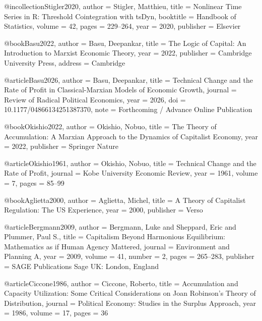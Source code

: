 @incollection{Stigler2020,
	author    = {Stigler, Matthieu},
	title     = {Nonlinear Time Series in {R}: Threshold Cointegration with {tsDyn}},
	booktitle = {Handbook of Statistics},
	volume    = {42},
	pages     = {229--264},
	year      = {2020},
	publisher = {Elsevier}
}



@book{Basu2022,
	author    = {Basu, Deepankar},
	title     = {The Logic of Capital: An Introduction to {Marxist} Economic Theory},
	year      = {2022},
	publisher = {Cambridge University Press},
	address   = {Cambridge}
}

@article{Basu2026,
	author  = {Basu, Deepankar},
	title   = {Technical Change and the Rate of Profit in {Classical-Marxian} Models of Economic Growth},
	journal = {Review of Radical Political Economics},
	year    = {2026},
	doi     = {10.1177/04866134251387370},
	note    = {Forthcoming / Advance Online Publication}
}

@book{Okishio2022,
	author    = {Okishio, Nobuo},
	title     = {The Theory of Accumulation: A {Marxian} Approach to the Dynamics of Capitalist Economy},
	year      = {2022},
	publisher = {Springer Nature}
}

@article{Okishio1961,
	author  = {Okishio, Nobuo},
	title   = {Technical Change and the Rate of Profit},
	journal = {Kobe University Economic Review},
	year    = {1961},
	volume  = {7},
	pages   = {85--99}
}


@book{Aglietta2000,
	author    = {Aglietta, Michel},
	title     = {A Theory of Capitalist Regulation: The US Experience},
	year      = {2000},
	publisher = {Verso}
}

@article{Bergmann2009,
	author  = {Bergmann, Luke and Sheppard, Eric and Plummer, Paul S.},
	title   = {Capitalism Beyond Harmonious Equilibrium: Mathematics as if Human Agency Mattered},
	journal = {Environment and Planning A},
	year    = {2009},
	volume  = {41},
	number  = {2},
	pages   = {265--283},
	publisher = {SAGE Publications Sage UK: London, England}
}

@article{Ciccone1986,
	author  = {Ciccone, Roberto},
	title   = {Accumulation and Capacity Utilization: Some Critical Considerations on Joan Robinson's Theory of Distribution},
	journal = {Political Economy: Studies in the Surplus Approach},
	year    = {1986},
	volume  = {17},
	pages   = {36}
}

